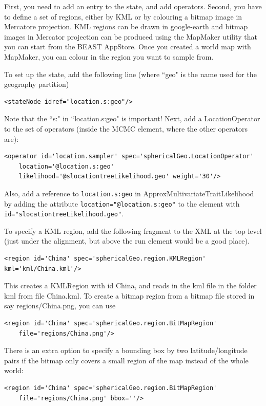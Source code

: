\documentclass{article}
\begin{document}
First, you need to add an entry to the state, and add operators.
Second, you have to define a set of regions, either by KML or by colouring a bitmap image in Mercatore projection. KML regions can be drawn in google-earth and bitmap images in Mercator projection can be produced using the MapMaker utility that you can start from the BEAST AppStore. Once you created a world map with MapMaker, you can colour in the region you want to sample from.

To set up the state, add the following line (where ``geo" is the name used for the geography partition)

\begin{verbatim}
<stateNode idref="location.s:geo"/>
\end{verbatim}

Note that the ``s:" in ``location.s:geo" is important!
Next, add a LocationOperator to the set of operators (inside the MCMC element, where the other operators are):

\begin{verbatim}
<operator id='location.sampler' spec='sphericalGeo.LocationOperator' 
    location='@location.s:geo' 
    likelihood='@slocationtreeLikelihood.geo' weight='30'/>
\end{verbatim}

Also, add a reference to {\tt location.s:geo} in ApproxMultivariateTraitLikelihood by adding the attribute {\tt location="@location.s:geo"} to the element with {\tt id="slocationtreeLikelihood.geo"}.

To specify a KML region, add the following fragment to the XML at the top level (just under the alignment, but above the run element would be a good place).

\begin{verbatim}
<region id='China' spec='sphericalGeo.region.KMLRegion' kml='kml/China.kml'/>
\end{verbatim}

This creates a KMLRegion with id China, and reads in the kml file in the folder kml from file China.kml. To create a bitmap region from a bitmap file stored in say regions/China.png, you can use

\begin{verbatim}
<region id='China' spec='sphericalGeo.region.BitMapRegion'
	file='regions/China.png'/>
\end{verbatim}
There is an extra option to specify a bounding box by two latitude/longitude pairs if the bitmap only covers a small region of the map instead of the whole world:
\begin{verbatim}
<region id='China' spec='sphericalGeo.region.BitMapRegion'
	file='regions/China.png' bbox=''/>
\end{verbatim}
\end{document}
